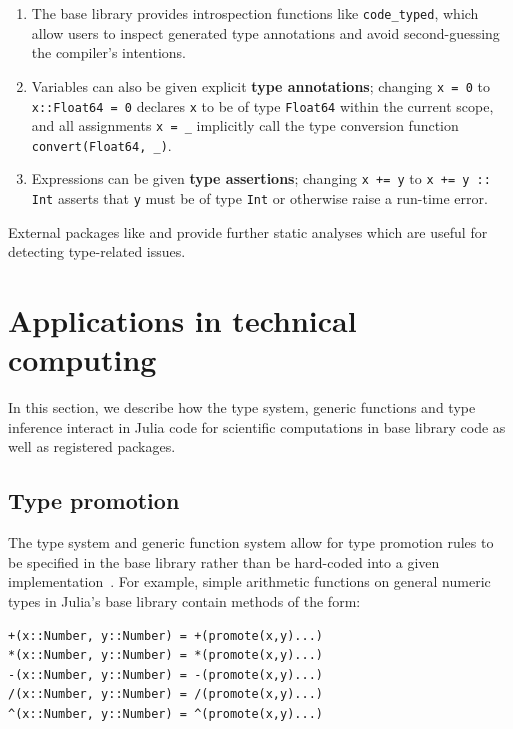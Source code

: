 \documentclass[10pt, preprint]{sigplanconf}
\begin{document}
\begin{enumerate}

	\item The base library provides introspection functions like
	\verb|code_typed|, which allow users to inspect generated type
	annotations and avoid second-guessing the compiler's intentions.

	\item Variables can also be given explicit \textbf{type annotations};
	changing \verb|x = 0| to \verb|x::Float64 = 0| declares \verb|x| to be
	of type \verb|Float64| within the current scope, and all assignments
	\verb|x = _| implicitly call the type conversion function
	\verb|convert(Float64, _)|.

	\item Expressions can be given \textbf{type assertions}; changing
	\verb|x += y| to \verb|x += y :: Int| asserts that \verb|y| must be of
	type \verb|Int| or otherwise raise a run-time error.

\end{enumerate}
%
External packages like  and  provide
further static analyses which are useful for detecting type-related issues.


\section{Applications in technical computing}

In this section, we describe how the type system, generic functions and type
inference interact in Julia code for scientific computations in base library
code as well as registered packages.

\subsection{Type promotion}

The type system and generic function system allow for type promotion rules to
be specified in the base library rather than be hard-coded into a given
implementation~\cite{Bezanson2012a}. For example, simple arithmetic functions
on general numeric types in Julia's base library contain methods of the form:

\begin{lstlisting}
+(x::Number, y::Number) = +(promote(x,y)...)
*(x::Number, y::Number) = *(promote(x,y)...)
-(x::Number, y::Number) = -(promote(x,y)...)
/(x::Number, y::Number) = /(promote(x,y)...)
^(x::Number, y::Number) = ^(promote(x,y)...)
\end{lstlisting}
\end{document}
